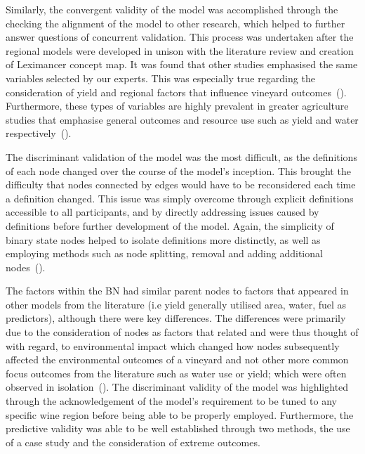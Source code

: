 \documentclass[fleqn,10pt]{wlscirep}
\begin{document}
Similarly, the convergent validity of the model was accomplished through the checking the alignment of the model to other research, which helped to further answer questions of concurrent validation. This process was undertaken after the regional models were developed in unison with the literature review and creation of Leximancer concept map. It was found that other studies emphasised the same variables selected by our experts. This was especially true regarding the consideration of yield and regional factors that influence vineyard outcomes~(\cite{abbalDecisionSupportSystem2016,campsGrapeHarvestYield2012,hallWithinseasonTemporalVariation2011}). Furthermore, these types of variables are highly prevalent in greater agriculture studies that emphasise general outcomes and resource use such as yield and water respectively~(\cite{heFruitYieldPrediction2022,laurentLocalInfluenceClimate2022}).

The discriminant validation of the model was the most difficult, as the definitions of each node changed over the course of the model's inception. This brought the difficulty that nodes connected by edges would have to be reconsidered each time a definition changed. This issue was simply overcome through explicit definitions accessible to all participants, and by directly addressing issues caused by definitions before further development of the model. Again, the simplicity of binary state nodes helped to isolate definitions more distinctly, as well as employing methods such as node splitting, removal and adding additional nodes~(\cite{korbBayesianArtificialIntelligence2011}).

The factors within the BN had similar parent nodes to factors that appeared in other models from the literature (i.e yield generally utilised area, water, fuel as predictors), although there were key differences. The differences were primarily due to the consideration of nodes as factors that related and were thus thought of with regard, to environmental impact which changed how nodes subsequently affected the environmental outcomes of a vineyard and not other more common focus outcomes from the literature such as water use or yield; which were often observed in isolation~(\cite{laurentReviewIssuesMethods2021}). The discriminant validity of the model was highlighted through the acknowledgement of the model's requirement to be tuned to any specific wine region before being able to be properly employed. Furthermore, the predictive validity was able to be well established through two methods, the use of a case study and the consideration of extreme outcomes.
\end{document}
